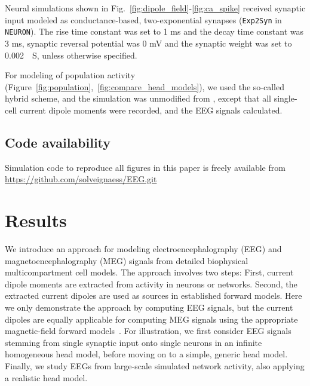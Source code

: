 \documentclass[preprint,10pt,authoryear]{elsarticle}
\newcommand{\hlb}[2][NavyBlue]{ {\sethlcolor{#1} \hl{#2}} }
\newcommand{\hlg}[2][Emerald]{ {\sethlcolor{#1} \hl{#2}} }
\newcommand{\snnote}[1]{\color{white}{\hlb{SN: #1 }}\color{black}}
\newcommand{\tvnnote}[1]{\color{white}{\hlg{TVN: #1 }}\color{black}}
\begin{document}
Neural simulations shown in Fig.~\ref{fig:dipole_field}-\ref{fig:ca_spike} received synaptic input modeled as conductance-based, two-exponential synapses (\texttt{Exp2Syn} in \texttt{NEURON}). The rise time constant was set to 1 ms and the decay time constant was 3 ms, synaptic reversal potential was 0 mV and the synaptic weight was set to 0.002~\si{\mu S}, unless otherwise specified. %

For modeling of population activity (Figure~\ref{fig:population},~\ref{fig:compare_head_models}), we  used the so-called hybrid scheme, and the simulation was unmodified from \cite{HAGEN2016}, except that all single-cell current dipole moments were recorded, and the EEG signals calculated.

\subsection{Code availability}
Simulation code to reproduce all figures in this paper is freely available from \url{https://github.com/solveignaess/EEG.git}

\section{Results}\label{sec:results}
\normalsize

We introduce an approach for modeling electroencephalography (EEG) and magnetoencephalography (MEG)
signals from detailed biophysical multicompartment cell models.  The approach involves two steps: First, current dipole moments are extracted from activity
in neurons or networks. Second, the extracted current dipoles are used as sources in established forward models. Here we only demonstrate the approach by computing EEG signals, but the current dipoles are equally applicable for computing MEG signals using the appropriate magnetic-field forward models~\citep{Ilmoniemi2019}.
For illustration, we first consider EEG signals stemming from single synaptic input onto single neurons in an infinite homogeneous head model, before moving on to a simple, generic head model. Finally, we study EEGs from large-scale simulated network activity, also applying a realistic head model.
\end{document}
